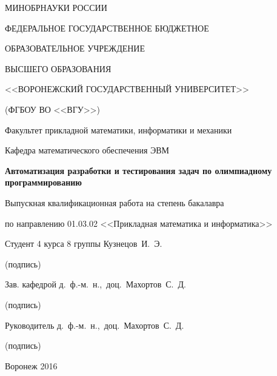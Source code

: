 \thispagestyle{empty}

{\large
\begin{center}
МИНОБРНАУКИ РОССИИ\par
ФЕДЕРАЛЬНОЕ ГОСУДАРСТВЕННОЕ БЮДЖЕТНОЕ\par
ОБРАЗОВАТЕЛЬНОЕ УЧРЕЖДЕНИЕ\par
ВЫСШЕГО ОБРАЗОВАНИЯ\par
<<ВОРОНЕЖСКИЙ ГОСУДАРСТВЕННЫЙ УНИВЕРСИТЕТ>>\par
(ФГБОУ ВО <<ВГУ>>)\par
\vspace{7mm}

Факультет прикладной математики, информатики и механики\par
\vspace{3mm}
Кафедра математического обеспечения ЭВМ\par
\vspace{18mm}

\textbf{Автоматизация разработки и тестирования задач по олимпиадному программированию}\par
\vspace{10mm}

Выпускная квалификационная работа на степень бакалавра\par
\vspace{5mm}
по направлению 01.03.02 <<Прикладная математика и информатика>>\par
\vspace{13mm}
\end{center}

Студент 4 курса 8 группы \underline{\qquad\qquad\qquad} Кузнецов~И.~Э.\par
\qquad\qquad\qquad\qquad\qquad\qquad\quad(подпись)\par
\vspace{2mm}
Зав. кафедрой \underline{\qquad\qquad\qquad} д.~ф.-м.~н.,~доц.~Махортов~С.~Д.\par
\qquad\qquad\qquad\qquad(подпись)\par
\vspace{2mm}
Руководитель \underline{\qquad\qquad\qquad} д.~ф.-м.~н.,~доц.~Махортов~С.~Д.\par
\qquad\qquad\qquad\qquad(подпись)\par
\vspace{23mm}

\begin{center}
Воронеж 2016
\end{center}}